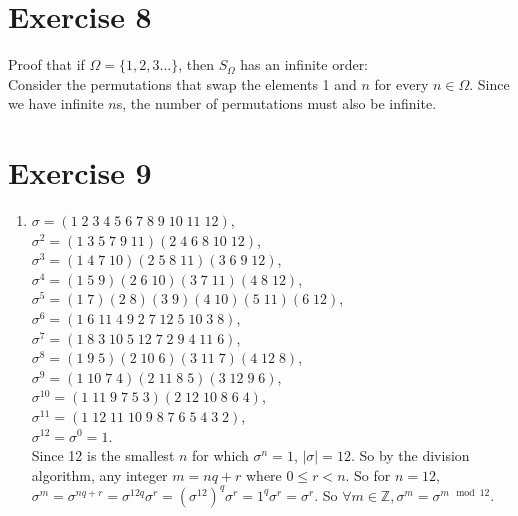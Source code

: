 \documentclass[12pt]{article}
\newcommand{\Z}{\mathbb{Z}}
\begin{document}
    \section*{Exercise 8}
    Proof that if $\Omega = \{1, 2, 3 ...\}$,
    then $S_{\Omega}$ has an infinite order: \\
    Consider the permutations that swap the elements 1 and $n$
    for every $n \in \Omega$.
    Since we have infinite $n$s, the number of permutations must also be
    infinite.
      

    \section*{Exercise 9}
    \begin{enumerate}[label=\textbf{\alph*.}]
        \item 
            $\sigma = (1\;2\;3\;4\;5\;6\;7\;8\;9\;10\;11\;12)$, \\
            $\sigma^2 = (1\;3\;5\;7\;9\;11)(2\;4\;6\;8\;10\;12)$, \\
            $\sigma^3 = (1\;4\;7\;10)(2\;5\;8\;11)(3\;6\;9\;12)$, \\
            $\sigma^4 = (1\;5\;9)(2\;6\;10)(3\;7\;11)(4\;8\;12)$, \\
            $\sigma^5 = (1\;7)(2\;8)(3\;9)(4\;10)(5\;11)(6\;12)$, \\
            $\sigma^6 = (1\;6\;11\;4\;9\;2\;7\;12\;5\;10\;3\;8)$, \\
            $\sigma^7 = (1\;8\;3\;10\;5\;12\;7\;2\;9\;4\;11\;6)$, \\
            $\sigma^8 = (1\;9\;5)(2\;10\;6)(3\;11\;7)(4\;12\;8)$, \\
            $\sigma^9 = (1\;10\;7\;4)(2\;11\;8\;5)(3\;12\;9\;6)$, \\
            $\sigma^{10} = (1\;11\;9\;7\;5\;3)(2\;12\;10\;8\;6\;4)$, \\
            $\sigma^{11} = (1\;12\;11\;10\;9\;8\;7\;6\;5\;4\;3\;2)$, \\
            $\sigma^{12} = \sigma^0 = 1$. \\
            Since 12 is the smallest $n$ for which $\sigma^n = 1$, 
            $|\sigma| = 12$.
            So by the division algorithm, any integer $m = nq + r$
            where $0 \leqslant r < n$.
            So for $n = 12$, $\sigma^m = \sigma^{nq + r}
            = \sigma^{12q}\sigma^r
            = (\sigma^12)^q\sigma^r
            = 1^q\sigma^r 
            = \sigma^r$.
            So $\forall m \in \Z, \sigma^m = \sigma^{m \mod 12}$.

\end{enumerate}
\end{document}
